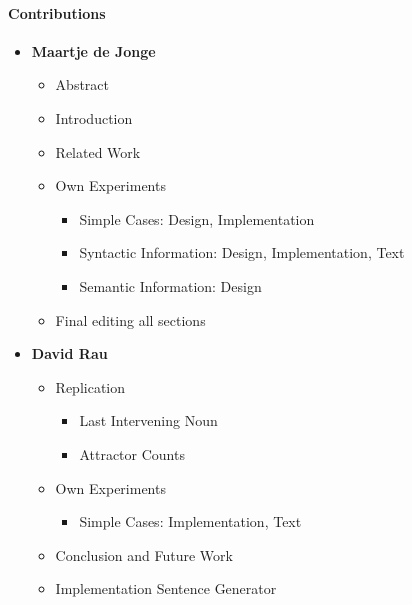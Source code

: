 \pagebreak

\paragraph{Contributions}

\begin{itemize}
  \item \textbf{Maartje de Jonge}
  \begin{itemize}
    \item Abstract
    \item Introduction
    \item Related Work
    \item Own Experiments
    \begin{itemize}
       \item Simple Cases: Design, Implementation
       \item Syntactic Information: Design, Implementation, Text
       \item Semantic Information: Design
    \end{itemize}
    \item Final editing all sections        
  \end{itemize}

  \item \textbf{David Rau}
    \begin{itemize}
     \item Replication
      \begin{itemize}
         \item Last Intervening Noun
         \item Attractor Counts
      \end{itemize}    
     \item Own Experiments
    \begin{itemize}
       \item Simple Cases: Implementation, Text
    \end{itemize}        
      \item Conclusion and Future Work
      \item Implementation Sentence Generator
  \end{itemize}


\end{itemize}


